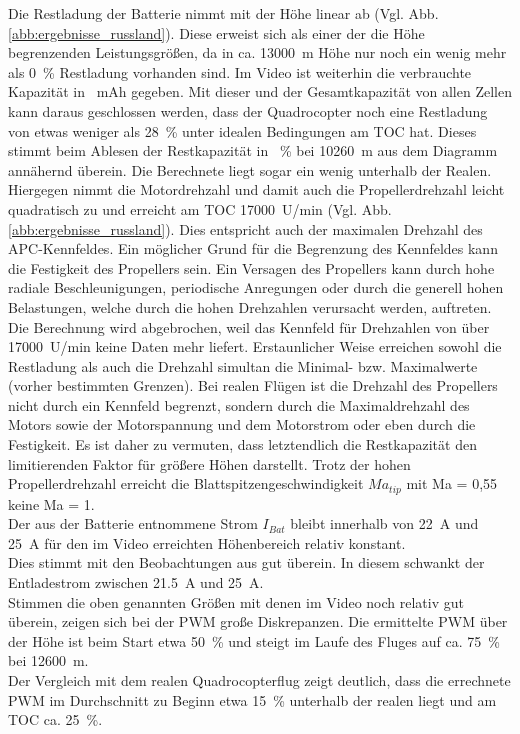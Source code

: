 Die Restladung der Batterie nimmt mit der Höhe linear ab (Vgl. Abb.\ref{abb:ergebnisse_russland}). Diese erweist sich als einer der die Höhe begrenzenden Leistungsgrößen, da in ca. \SI{13000}{m} Höhe nur noch ein wenig mehr als \SI{0}{\%} Restladung vorhanden sind. Im Video ist weiterhin die verbrauchte Kapazität in \SI{}{mAh} gegeben. Mit dieser und der Gesamtkapazität von allen Zellen kann daraus geschlossen werden, dass der Quadrocopter noch eine Restladung von etwas weniger als \SI{28}{\%} unter idealen Bedingungen am TOC hat. Dieses stimmt beim Ablesen der Restkapazität in \SI{}{\%} bei \SI{10260}{m} aus dem Diagramm annähernd überein. Die Berechnete liegt sogar ein wenig unterhalb der Realen. \\
Hiergegen nimmt die Motordrehzahl und damit auch die Propellerdrehzahl leicht quadratisch zu und erreicht am TOC \SI{17000}{U/min} (Vgl. Abb.\ref{abb:ergebnisse_russland}).  
Dies entspricht auch der maximalen Drehzahl des APC-Kennfeldes. Ein möglicher Grund für die Begrenzung des Kennfeldes kann die Festigkeit des Propellers sein. Ein Versagen des Propellers kann durch hohe radiale Beschleunigungen, periodische Anregungen oder durch die generell hohen Belastungen, welche durch die hohen Drehzahlen verursacht werden, auftreten. Die Berechnung wird abgebrochen, weil das Kennfeld für Drehzahlen von über \SI{17000}{U/min} keine Daten mehr liefert. Erstaunlicher Weise erreichen sowohl die Restladung als auch die Drehzahl simultan die Minimal- bzw. Maximalwerte (vorher bestimmten Grenzen). Bei realen Flügen ist die Drehzahl des Propellers nicht durch ein Kennfeld begrenzt, sondern durch die Maximaldrehzahl des Motors sowie der Motorspannung und dem Motorstrom oder eben durch die Festigkeit. Es ist daher zu vermuten, dass letztendlich die Restkapazität den limitierenden Faktor für größere Höhen darstellt. Trotz der hohen Propellerdrehzahl erreicht die Blattspitzengeschwindigkeit \ensuremath{Ma_{tip}} mit Ma = 0,55 keine Ma = 1. \\
Der aus der Batterie entnommene Strom \ensuremath{I_{Bat}} bleibt innerhalb von \SI{22}{A} und \SI{25}{A} für den im Video erreichten Höhenbereich relativ konstant. \\
Dies stimmt mit den Beobachtungen aus \cite{Anderson.2018} gut überein. In diesem schwankt der Entladestrom zwischen \SI{21,5}{A} und \SI{25}{A}. \\
Stimmen die oben genannten Größen mit denen im Video noch relativ gut überein, zeigen sich bei der PWM große Diskrepanzen. Die ermittelte PWM über der Höhe ist beim Start etwa \SI{50}{\%} und steigt im Laufe des Fluges auf ca. \SI{75}{\%} bei \SI{12600}{m}. \\
Der Vergleich mit dem realen Quadrocopterflug zeigt deutlich, dass die errechnete PWM im Durchschnitt zu Beginn etwa \SI{15}{\%} unterhalb der realen liegt und am TOC ca. \SI{25}{\%}.


